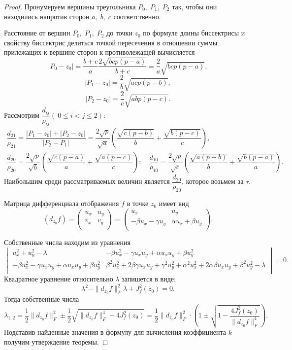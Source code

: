 \documentclass[a4paper,11pt,twoside]{article}
\begin{document}
\begin{proof}
 Пронумеруем вершины треугольника $P_0, \; P_1, \; P_2$ так, чтобы они находились напротив сторон $a, \; b, \; c$ соответственно. 

Расстояние от вершин $P_0,\; P_1,\; P_2$ до точки $z_0$ по формуле длины биссектрисы и свойству биссектрис делиться точкой пересечения в отношении суммы прилежащих к вершине сторон к противолежащей вычисляется
$$|P_0-z_0|=\dfrac{b+c}{a} \dfrac{2\sqrt{bcp(p-a)}}{b+c} =\dfrac{2}{a}\sqrt{bcp(p-a)},$$
$$|P_1-z_0|=\dfrac{2}{b}\sqrt{acp(p-b)},$$
$$|P_2-z_0|=\dfrac{2}{c}\sqrt{abp(p-c)}.$$
Рассмотрим $\dfrac{d_{ij}}{\rho_{ij}} (\: 0 \leqslant i<j\leqslant 2)$:
\begin{multline*}
\dfrac{d_{21}}{\rho_{21}}=\dfrac{|P_1-z_0|+|P_2-z_0|}{|P_2-P_1|}=\dfrac{2 \sqrt{p}}{\sqrt{a}} \left(\dfrac{\sqrt{c(p-b)}}{b} + \dfrac{\sqrt{b(p-c)}}{c} \right),\\
\dfrac{d_{20}}{\rho_{20}}=\dfrac{2 \sqrt{p}}{\sqrt{b}} \left(\dfrac{\sqrt{c(p-a)}}{a} + \dfrac{\sqrt{a(p-c)}}{c} \right);\quad
\dfrac{d_{10}}{\rho_{10}}=\dfrac{2 \sqrt{p}}{\sqrt{c}} \left(\dfrac{\sqrt{a(p-b)}}{b} + \dfrac{\sqrt{b(p-a)}}{a} \right).
\end{multline*}
Наибольшим среди рассматриваемых величин является $\dfrac{d_{20}}{\rho_{20}}$, которое возьмем за $\tau$.
	
Матрица дифференциала отображения $f$ в точке $z_0$ имеет вид
\begin{equation*}
\left( d_{z_0} f \right) = \left(  \begin{array}{cc}
u_x & u_y \\
v_x & v_y\\
\end{array} \right) =
\left(  \begin{array}{cc}
u_x & u_y \\
-\beta u_x - \gamma u_y & \alpha u_x + \beta u_y\\
\end{array} \right).
\end{equation*}

Собственные числа находим из уравнения
\begin{equation*}
\begin{vmatrix}
u_x^2+u_y^2-\lambda & -\beta u_x^2 - \gamma u_x u_y+\alpha u_x u_y+ \beta u_y^2 \\
-\beta u_x^2 - \gamma u_x u_y+\alpha u_x u_y+ \beta u_y^2 & \beta^2 u_x^2 +2\beta \gamma u_x u_y+\gamma^2 u_y^2+ \alpha^2 u_x^2+2\alpha \beta u_x u_y+ \beta^2 u_y^2-\lambda\\
\end{vmatrix} =0.
\end{equation*}
Квадратное уравнение относительно $\lambda$ запишется в виде:
$$\lambda^2- \|d_{z_0}f\|_F^2 \lambda+J^2_f(z_0)=0.$$
Тогда собственные числа
$$
\lambda_{1,2}=\dfrac{1}{2} \|d_{z_0}f\|_F^2
\pm \dfrac{1 }{2} \sqrt{\|d_{z_0}f\|_F^4
	-4 J^2_f(z_0)}=\dfrac{1}{2} \|d_{z_0}f\|_F^2 
\cdot \left(1 \pm \sqrt{1 - \dfrac{4 J^2_f(z_0)}{\|d_{z_0}f\|_F^4}} \right).
$$
Подставив найденные значения в формулу для вычисления коэффициента $k$ получим утверждение теоремы. 
\end{proof}
\end{document}
